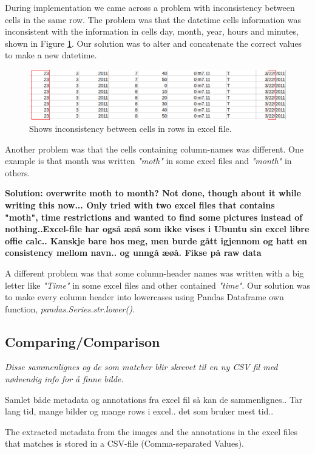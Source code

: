 \documentclass[USenglish]{uit-thesis}
\begin{document}
During implementation we came across a problem with inconsistency between cells in the same row. The problem was that the datetime cells information was inconsistent with the information in cells day, month, year, hours and minutes, shown in Figure \ref{fig:inconsistency}. Our solution was to alter and concatenate the correct values to make a new datetime.

\begin{figure}[b]
\centering
\includegraphics[width=\textwidth]{inconsistency2.png}
\caption{Shows inconsistency between cells in rows in excel file.}
\label{fig:inconsistency}
\end{figure}


Another problem was that the cells containing column-names was different. One example is that month was written \textit{"moth"} in some excel files and \textit{"month"} in others.

\textbf{Solution: overwrite moth to month? Not done, though about it while writing this now... Only tried with two excel files that contains "moth", time restrictions and wanted to find some pictures instead of nothing..Excel-file har også æøå som ikke vises i Ubuntu sin excel libre offie calc.. Kanskje bare hos meg, men burde gått igjennom og hatt en consistency mellom navn.. og unngå æøå. Fikse på raw data}

A different problem was that some column-header names was written with a big letter like \textit{"Time"} in some excel files and other contained \textit{"time"}. Our solution was to make every column header into lowercases using Pandas Dataframe own function, \textit{pandas.Series.str.lower()}.


\subsection{Comparing/Comparison}
\textit{Disse sammenlignes og de som matcher blir skrevet til en ny CSV fil med nødvendig info for å finne bilde.}

Samlet både metadata og annotations fra excel fil så kan de sammenlignes.. 
Tar lang tid, mange bilder og mange rows i excel.. det som bruker mest tid..


The extracted metadata from the images and the annotations in the excel files that matches is stored in a CSV-file (Comma-separated Values).
\end{document}
